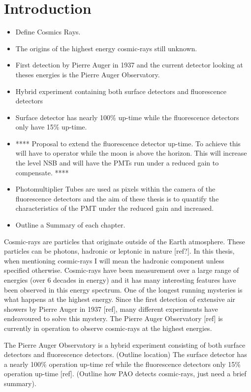 \chapter*{Introduction}\label{Ch:Intro}

\begin{itemize}
\item Define Cosmics Rays.
\item The origins of the highest energy cosmic-rays still unknown.
\item First detection by Pierre Auger in 1937 and the current detector looking at theses energies is the Pierre Auger Observatory.
\item Hybrid experiment containing both surface detectors and fluorescence detectors
\item Surface detector has nearly 100\% up-time while the fluorescence detectors only have 15\% up-time.
\item **** Proposal to extend the fluorescence detector up-time. To achieve this will have to operator while the moon is above the horizon. This will increase the level NSB and will have the PMTs run under a reduced gain to compensate. ****
\item Photomultiplier Tubes are used as pixels within the camera of the fluorescence detectors and  the aim of these thesis is to quantify the characteristics of the PMT under the reduced gain and increased.
\item Outline a Summary of each chapter.
\end{itemize}


Cosmic-rays are particles that originate outside of the Earth atmosphere. These particles can be photons, hadronic or leptonic in nature [ref?]. In this thesis, when mentioning cosmic-rays I will mean the hadronic component unless specified otherwise. Cosmic-rays have been measurement over a large range of energies (over 6 decades in energy) and it has many interesting features have been observed in this energy spectrum. One of the longest running mysteries is what happens at the highest energy. Since the first detection of extensive air showers by Pierre Auger in 1937 [ref], many different experiments have endeavoured to solve this mystery. The Pierre Auger Observatory [ref] is currently in operation to observe cosmic-rays at the highest energies. 

The Pierre Auger Observatory is a hybrid experiment consisting of both surface detectors and fluorescence detectors. (Outline location) The surface detector has a nearly 100\% operation up-time {ref} while the fluorescence detectors only 15\% operation up-time [ref]. (Outline how PAO detects cosmic-rays, just need a brief summary).

